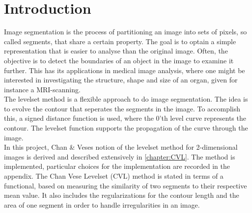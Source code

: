 
\chapter{Introduction}\label{chapter:introduction}

Image segmentation is the process of partitioning an image into sets of pixels, so called segments, that share a certain property. The goal is to optain a simple representation that is easier to analyse than the original image. Often, the objective is to detect the boundaries of an object in the image to examine it further. This has its applications in medical image analysis, where one might be interested in investigating the structure, shape and size of an organ, given for instance a MRI-scanning.\\

The levelset method is a flexible approach to do image segmentation. The idea is to evolve the contour that seperates the segments in the image. To accomplish this, a signed distance function is used, where the 0'th level curve represents the contour. The levelset function supports the propagation of the curve through the image.\\

In this project, Chan \& Veses notion of the levelset method for 2-dimensional images is derived and described extensively in \cref{chapter:CVL}. The method is implemented, particular choices for the implementation are recorded in the appendix. The Chan Vese Levelset (CVL) method is stated in terms of a functional, based on measuring the similarity of two segments to their respective mean value. It also includes the regularizations for the contour length and the area of one segment in order to handle irregularities in an image.\\

